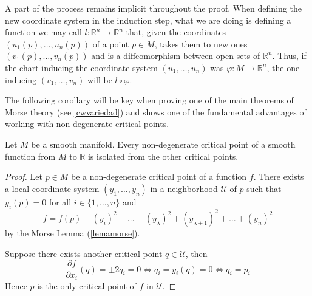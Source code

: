 \bigskip

\begin{remark}
    A part of the process remains implicit throughout the proof. When defining the new coordinate system in the induction step, what we are doing is defining a function we may call $l:\mathbb{R}^n \to \mathbb{R}^n$ that, given the coordinates $(u_1(p),\dots, u_n(p))$ of a point $p\in M$, takes them to new ones $(v_1(p),\dots, v_n(p))$ and is a diffeomorphism between open sets of $\mathbb{R}^n$. Thus, if the chart inducing the coordinate system $(u_1,\dots, u_n)$ was $\varphi : M \to \mathbb{R}^n$, the one inducing $(v_1,\dots, v_n)$ will be $l\circ \varphi$.
\end{remark}
\bigskip

The following corollary will be key when proving one of the main theorems of Morse theory (see \ref{cwvariedad}) and shows one of the fundamental advantages of working with non-degenerate critical points.
\bigskip
\begin{corollary}
        Let $M$ be a smooth manifold. Every non-degenerate critical point of a smooth function from $M$ to $\mathbb{R}$ is isolated from the other critical points.
\end{corollary}
\begin{proof}
    Let $p\in M$ be a non-degenerate critical point of a function $f$. There exists a local coordinate system $(y_1,\dots, y_n)$ in a neighborhood $\mathcal{U}$ of $p$ such that $y_i(p)=0$ for all $i\in\{1,\dots,n\}$ and
    \begin{equation*}
        f=f(p)-(y_i)^2-\dots-(y_\lambda)^2 + (y_{\lambda +1})^2+\dots + (y_n)^2 %
    \end{equation*}
    by the Morse Lemma (\ref{lemamorse}).

    Suppose there exists another critical point $q\in\mathcal{U}$, then
    \begin{equation*}
        \frac{\partial f}{\partial x_i}(q)=\pm 2q_i= 0\iff q_i= y_i(q)=0\iff q_i=p_i
    \end{equation*}
    Hence $p$ is the only critical point of $f$ in $\mathcal{U}$.

\end{proof}
\bigskip

